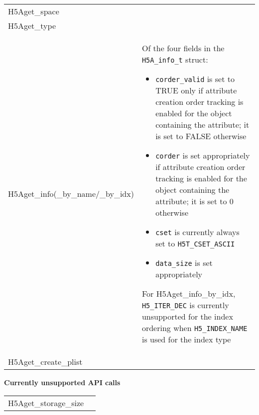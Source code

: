\documentclass[../users_guide.tex]{subfiles}
\begin{document}
\begin{center}

\begin{tabularx}{\linewidth}{| X | >{\RaggedRight}X |}
\hline
\rowcolor{lightgray!50}%
\multicolumn{1}{| c |}{\textbf{API call}} & \multicolumn{1}{c |}{\textbf{Notes}} \\ \hline

H5Aget\_space & \\ \hline
H5Aget\_type & \\ \hline
H5Aget\_info(\_by\_name/\_by\_idx) & Of the four fields in the \texttt{H5A\_info\_t} struct:
                                     \begin{itemize}
                                         \item \texttt{corder\_valid} is set to TRUE only if attribute creation order tracking is enabled for the object containing the attribute; it is set to FALSE otherwise
                                         \item \texttt{corder} is set appropriately if attribute creation order tracking is enabled for the object containing the attribute; it is set to 0 otherwise
                                         \item \texttt{cset} is currently always set to \texttt{H5T\_CSET\_ASCII}
                                         \item \texttt{data\_size} is set appropriately
                                     \end{itemize}

                                     For H5Aget\_info\_by\_idx, \texttt{H5\_ITER\_DEC} is currently unsupported for the index ordering when \texttt{H5\_INDEX\_NAME} is used for the index type\\ \hline
H5Aget\_create\_plist & \\ \hline

\end{tabularx}

\textbf{Currently unsupported API calls}
\vspace{.1in} \\

\begin{tabularx}{\linewidth}{| X | >{\RaggedRight}X |}
\hline
\rowcolor{lightgray!50}%
\multicolumn{1}{| c |}{\textbf{API call}} & \multicolumn{1}{c |}{\textbf{Notes}} \\ \hline

H5Aget\_storage\_size\footnotemark[1] & \\ \hline

\end{tabularx}


\end{center}
\end{document}
